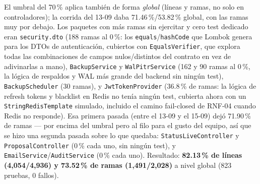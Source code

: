 El umbral del 70\,\% aplica también de forma \emph{global} (líneas y ramas, no solo en controladores);
la corrida del 13-09 daba 71.46\,\%/53.82\,\% global, con las ramas muy por debajo. Los paquetes con más
ramas sin ejercitar y cero test dedicado eran \texttt{security.dto} (188 ramas al 0\,\%: los
\texttt{equals}/\texttt{hashCode} que Lombok genera para los DTOs de autenticación, cubiertos con
\texttt{EqualsVerifier}, que explora todas las combinaciones de campos nulos/distintos del contrato en
vez de adivinarlas a mano), \texttt{BackupService} y \texttt{WalPitrService} (162 y 90 ramas al 0\,\%,
la lógica de respaldos y WAL más grande del backend sin ningún test), \texttt{BackupScheduler} (30
ramas), y \texttt{JwtTokenProvider} (36.8\,\% de ramas: la lógica de refresh tokens y blacklist en Redis
no tenía ningún test, cubierta ahora con un \texttt{StringRedisTemplate} simulado, incluido el camino
fail-closed de RNF-04 cuando Redis no responde). Esa primera pasada (entre el 13-09 y el 15-09) dejó 71.90\,\% de ramas --- por
encima del umbral pero al filo para el gusto del equipo, así que se hizo una segunda pasada sobre lo
que quedaba: \texttt{StatusLiveController} y \texttt{ProposalController} (0\,\% cada uno,
sin ningún test), y \texttt{EmailService}/\texttt{AuditService} (0\,\% cada uno). Resultado:
\textbf{82.13\,\% de líneas (4,054/4,936) y 73.52\,\% de ramas (1,491/2,028)} a nivel global (823
pruebas, 0 fallos).

